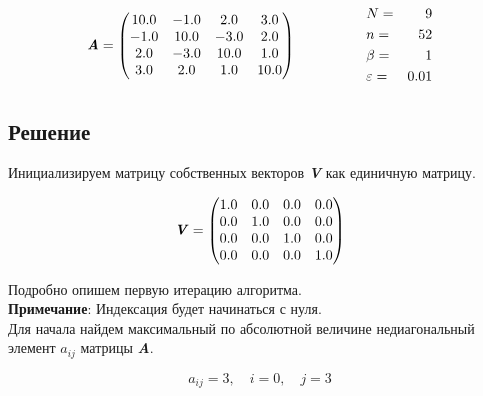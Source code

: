 \documentclass[a4paper, 14pt]{extarticle}
\begin{document}
\begin{align*}
  \textbf{\textit{A}} = \begin{pmatrix}
    10.0 & -1.0 & 2.0 & 3.0 \\
    -1.0 & 10.0 & -3.0 & 2.0 \\
    2.0 & -3.0 & 10.0 & 1.0 \\
    3.0 & 2.0 & 1.0 & 10.0 \\
  \end{pmatrix}
  \hspace{50pt}
  \begin{aligned}
    & N = & 9 \\
    & n = & 52 \\
    & \beta = & 1 \\
    & \varepsilon = & 0.01
  \end{aligned}
\end{align*}

\subsection*{Решение}

Инициализируем матрицу собственных векторов \textbf{\textit{V}} как 
единичную матрицу.

\vspace{10pt}

\begin{equation*}
  \textbf{\textit{V}} = \begin{pmatrix}
    1.0 & 0.0 & 0.0 & 0.0 \\
    0.0 & 1.0 & 0.0 & 0.0 \\
    0.0 & 0.0 & 1.0 & 0.0 \\
    0.0 & 0.0 & 0.0 & 1.0 \\
    \end{pmatrix}
\end{equation*}

\vspace{10pt}

Подробно опишем первую итерацию алгоритма. \\
{ \footnotesize \textbf{Примечание}: Индексация будет начинаться с нуля}.\\

Для начала найдем максимальный по абсолютной величине недиагональный
элемент $a_{ij}$ матрицы \textbf{\textit{A}}.

\begin{equation*}
  a_{ij} = 3, \quad i = 0, \quad j = 3
\end{equation*}
\end{document}
